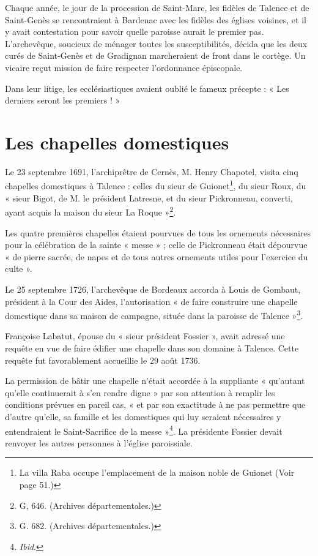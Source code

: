 \documentclass[a4paper,11pt]{book}
\begin{document}
Chaque année, le jour de la procession de Saint-Marc, les fidèles de Talence et de Saint-Genès se rencontraient à Bardenac avec les fidèles des églises voisines, et il y avait contestation pour savoir quelle paroisse aurait le premier pas. L'archevêque, soucieux de ménager toutes les susceptibilités, décida que les deux curés de Saint-Genès et de Gradignan marcheraient de front dans le cortège. Un vicaire reçut mission de faire respecter l'ordonnance épiscopale.

Dans leur litige, les ecclésiastiques avaient oublié le fameux précepte : « Les derniers seront les premiers ! »

\section{Les chapelles domestiques}

Le 23 septembre 1691, l'archiprêtre de Cernès, M. Henry Chapotel, visita cinq chapelles domestiques à Talence : celles du sieur de Guionet\footnote{La villa Raba occupe l'emplacement de la maison noble de Guionet (Voir page 51.)}, du sieur Roux, du « sieur Bigot, de M. le président Latresne, et du sieur Pickronneau, converti, ayant acquis la maison du sieur La Roque »\footnote{G, 646. (Archives départementales.)}.

Les quatre premières chapelles étaient pourvues de tous les ornements nécessaires pour la célébration de la sainte « messe » ; celle de Pickronneau était dépourvue « de pierre sacrée, de napes et de tous autres ornements utiles pour l'exercice du culte ».

Le 25 septembre 1726, l'archevêque de Bordeaux accorda à Louis de Gombaut, président à la Cour des Aides, l'autorisation « de faire construire une chapelle domestique dans sa maison de campagne, située dans la paroisse de Talence »\footnote{G. 682. (Archives départementales.)}.

Françoise Labatut, épouse du « sieur président Fossier », avait adressé une requête en vue de faire édifier une chapelle dans son domaine à Talence. Cette requête fut favorablement accueillie le 29 août 1736.

La permission de bâtir une chapelle n'était accordée à la suppliante « qu'autant qu'elle continuerait à s'en rendre digne » par son attention à remplir les conditions prévues en pareil cas, « et par son exactitude à ne pas permettre que d'autre qu'elle, sa famille et les domestiques qui luy seraient nécessaires y entendraient le Saint-Sacrifice de la messe »\footnote{\textit{Ibid}.}. La présidente Fossier devait renvoyer les autres personnes à l'église paroissiale.
\end{document}
